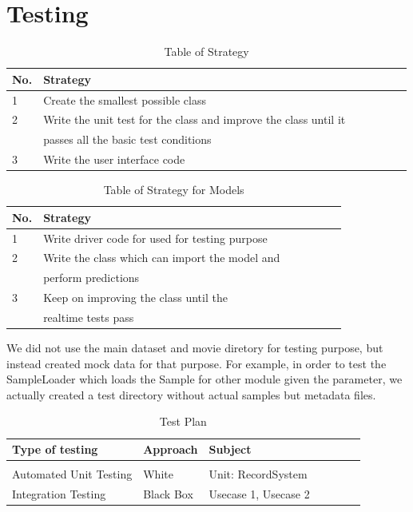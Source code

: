 \documentclass[12pt,a4paper,man]{report}
\begin{document}
\section{Testing}
\label{sec:org9bb589f}


\begin{table}[htbp]
\caption{\label{table:strattable}
Table of Strategy}
\centering
\begin{tabular}{|l|l|l|l|l|lp{3cm}|}
\hline
\textbf{No.} & \textbf{Strategy}\\
\hline
1 & Create the smallest possible class\\
\hline
2 & Write the unit test for the class    and improve the class until it\\
 & passes all the basic test conditions\\
\hline
3 & Write the user interface code\\
\hline
\end{tabular}
\end{table}


\begin{table}[htbp]
\caption{\label{table:mstrattable}
Table of Strategy for Models}
\centering
\begin{tabular}{|l|l|l|l|l|lp{3cm}|}
\hline
\textbf{No.} & \textbf{Strategy}\\
\hline
1 & Write driver code for used for testing purpose\\
\hline
2 & Write the class which can import the model and\\
 & perform predictions\\
\hline
3 & Keep on improving the class until the\\
 & realtime tests pass\\
\hline
\end{tabular}
\end{table}

We did not use the main dataset and movie diretory for testing purpose, but instead created mock data for that purpose. For example, in order to test the SampleLoader which loads the Sample for other module given the parameter, we actually created a test directory without actual samples but metadata files. 

\begin{table}[htbp]
\caption{\label{table:testtable}
Test Plan}
\centering
\begin{tabular}{|l|l|l|l|l|lp{3cm}|}
\hline
\textbf{Type of testing} & \textbf{Approach} & \textbf{Subject}\\
\hline
 &  & \\
Automated Unit Testing & White & Unit: RecordSystem\\
Integration Testing & Black Box & Usecase 1, Usecase 2\\
\hline
\end{tabular}
\end{table}
\end{document}
